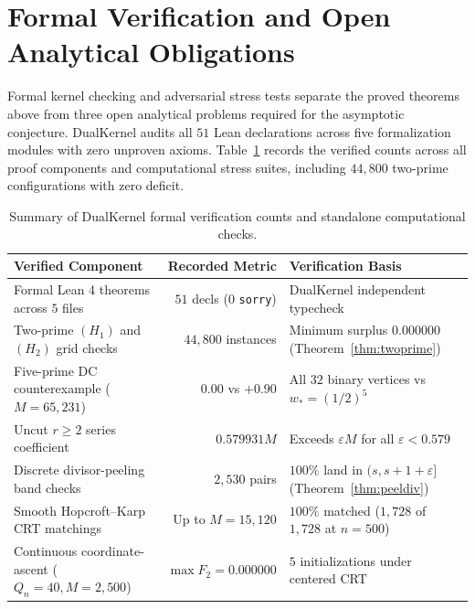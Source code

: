 \documentclass[11pt]{article}
\begin{document}
\section{Formal Verification and Open Analytical Obligations}

Formal kernel checking and adversarial stress tests separate the proved theorems above from three open analytical problems required for the asymptotic conjecture. DualKernel audits all $51$ Lean declarations across five formalization modules with zero unproven axioms. Table~\ref{tab:checks} records the verified counts across all proof components and computational stress suites, including $44{,}800$ two-prime configurations with zero deficit.

\begin{table}[ht]
\centering
\small
\begin{tabular}{p{5.2cm}rp{5.4cm}}
\toprule
Verified Component & Recorded Metric & Verification Basis \\
\midrule
Formal Lean 4 theorems across $5$ files & $51$ decls ($0$ \texttt{sorry}) & DualKernel independent typecheck \\
Two-prime $(H_1)$ and $(H_2)$ grid checks & $44{,}800$ instances & Minimum surplus $0.000000$ (Theorem~\ref{thm:twoprime}) \\
Five-prime DC counterexample ($M = 65{,}231$) & $0.00$ vs $+0.90$ & All $32$ binary vertices vs $w_* = (1/2)^5$ \\
Uncut $r \ge 2$ series coefficient & $0.579931 M$ & Exceeds $\varepsilon M$ for all $\varepsilon < 0.579$ \\
Discrete divisor-peeling band checks & $2{,}530$ pairs & $100\%$ land in $(s, s + 1 + \varepsilon]$ (Theorem~\ref{thm:peeldiv}) \\
Smooth Hopcroft--Karp CRT matchings & Up to $M = 15{,}120$ & $100\%$ matched ($1{,}728$ of $1{,}728$ at $n = 500$) \\
Continuous coordinate-ascent ($Q_n = 40, M = 2{,}500$) & $\max F_2 = 0.000000$ & $5$ initializations under centered CRT \\
\bottomrule
\end{tabular}
\caption{Summary of DualKernel formal verification counts and standalone computational checks.}
\label{tab:checks}
\end{table}
\end{document}
